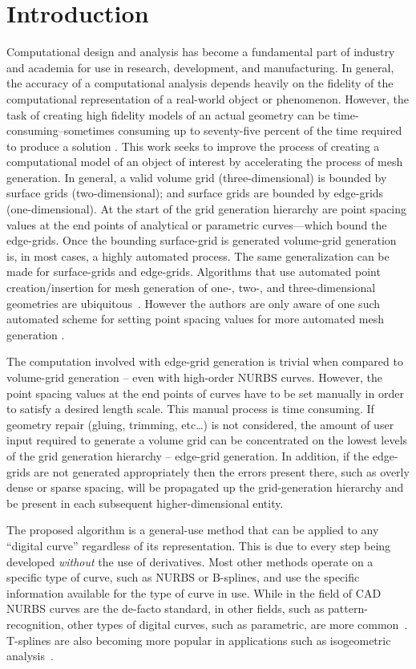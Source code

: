 \section{Introduction}
Computational design and analysis has become a fundamental part of industry and academia for use in research, development, and manufacturing. In general, the accuracy of a computational analysis depends heavily on the fidelity of the computational representation of a real-world object or phenomenon.  However, the task of creating high fidelity models of an actual geometry can be time-consuming--sometimes consuming up to seventy-five percent of the time required to produce a solution \cite{bischoff05}. This work seeks to improve the process of creating a computational model of an object of interest by accelerating the process of mesh generation. In general, a valid volume grid (three-dimensional) is bounded by surface grids (two-dimensional); and surface grids are bounded by edge-grids (one-dimensional). At the start of the grid generation hierarchy are point spacing values at the end points of analytical or parametric curves—which bound the edge-grids. Once the bounding surface-grid is generated volume-grid generation is, in most cases, a highly automated process. The same generalization can be made for surface-grids and edge-grids. Algorithms that use automated point creation/insertion for mesh generation of one-, two-, and three-dimensional geometries are ubiquitous~\cite{cubit,delaunay,aflr}. However the authors are only aware of one such automated scheme for setting point spacing values for more automated mesh generation \cite{mclaurin12}.

The computation involved with edge-grid generation is trivial when compared to volume-grid generation -- even with high-order NURBS curves.  However, the point spacing values at the end points of curves have to be set manually in order to satisfy a desired length scale. This manual process is time consuming. If geometry repair (gluing, trimming, etc…) is not considered, the amount of user input required to generate a volume grid can be concentrated on the lowest levels of the grid generation hierarchy -- edge-grid generation. In addition, if the edge-grids are not generated appropriately then the errors present there, such as overly dense or sparse spacing, will be propagated up the grid-generation hierarchy and be present in each subsequent higher-dimensional entity.

The proposed algorithm is a general-use method that can be applied to any ``digital curve'' regardless of its representation. This is due to every step being developed {\it without} the use of derivatives. Most other methods operate on a specific type of curve, such as NURBS or B-splines, and use the specific information available for the type of curve in use. While in the field of CAD NURBS curves are the de-facto standard, in other fields, such as pattern-recognition, other types of digital curves, such as parametric, are more common~\cite{interactive_curve_modeling}.  T-splines are also becoming more popular in applications such as isogeometric analysis~\cite{iga}. 


